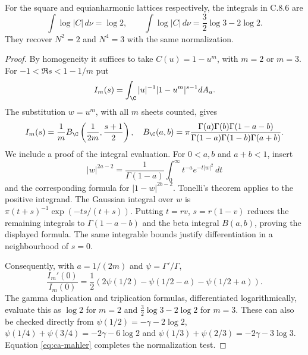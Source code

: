 \begin{statement}
For the square and equianharmonic lattices respectively, the
integrals in C.8.6 are
\[
 \int\log|C|\,d\nu=\log2,\qquad
 \int\log|C|\,d\nu=\frac32\log3-2\log2.
\]
They recover $N^2=2$ and $N^4=3$ with the same normalization.
\end{statement}
\begin{proof}
By homogeneity it suffices to take $C(u)=1-u^m$, with $m=2$
or $m=3$. For $-1<\Re s<1-1/m$ put
\[
 I_m(s)=\int_{\C} |u|^{-1}|1-u^m|^{s-1}dA_u.
\]
The substitution $w=u^m$, with all $m$ sheets counted, gives
\[
 I_m(s)=\frac1m B_{\C}\left(\frac1{2m},\frac{s+1}2\right),
 \quad
 B_{\C}(a,b)=\pi\frac{\Gamma(a)\Gamma(b)\Gamma(1-a-b)}
                   {\Gamma(1-a)\Gamma(1-b)\Gamma(a+b)}.
\]
We include a proof of the integral evaluation. For
$0<a,b$ and $a+b<1$, insert
\[
 |w|^{2a-2}=\frac1{\Gamma(1-a)}
       \int_0^\infty t^{-a}e^{-t|w|^2}\,dt
\]
and the corresponding formula for $|1-w|^{2b-2}$.
Tonelli's theorem applies to the positive integrand. The
Gaussian integral over $w$ is
$\pi(t+s)^{-1}\exp(-ts/(t+s))$.
Putting $t=rv$, $s=r(1-v)$ reduces the remaining integrals
to $\Gamma(1-a-b)$ and the beta integral $B(a,b)$, proving
the displayed formula. The same integrable bounds justify
differentiation in a neighbourhood of $s=0$.

Consequently, with $a=1/(2m)$ and $\psi=\Gamma'/\Gamma$,
\[
 \frac{I_m'(0)}{I_m(0)}
 =\frac12\left(2\psi(1/2)-\psi(1/2-a)-\psi(1/2+a)\right).
\]
The gamma duplication and triplication formulas, differentiated
logarithmically, evaluate this as $\log2$ for $m=2$ and
$\frac32\log3-2\log2$ for $m=3$. These can also be checked
directly from
$\psi(1/2)=-\gamma-2\log2$,
$\psi(1/4)+\psi(3/4)=-2\gamma-6\log2$ and
$\psi(1/3)+\psi(2/3)=-2\gamma-3\log3$.
Equation \eqref{eq:ca-mahler} completes the normalization test.
\end{proof}
